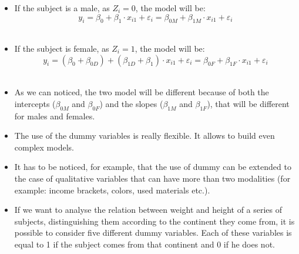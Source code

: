 \begin{frame}
  \vspace*{.25cm}
  \begin{itemize}
    \item If the subject is a male, as  $ Z_i=0 $, the model will be:
      \vspace{-0.25cm} $$ y_i = \beta_0 + \beta_1 \cdot x_{i1} + \varepsilon_i = \beta_{0M} + \beta_{1M} \cdot x_{i1} + \varepsilon_i $$ \\
    \vspace{0.25cm}
    \item If the subject is female, as $ Z_i=1 $, the model will be:
      \vspace{-0.5cm} $$ y_i= (\beta_0 + \beta_{0D}) + (\beta_{1D} + \beta_1) \cdot x_{i1} + \varepsilon_i = \beta_{0F} + \beta_{1F} \cdot x_{i1} + \varepsilon_i $$ \\
    \vspace{0.25cm}
    \item As we can noticed, the two model will be different because of both the intercepts ($ \beta_{0M} $ and $ \beta_{0F} $) and the slopes ($ \beta_{1M} $ and $ \beta_{1F} $), that will be different for males and females.
  \end{itemize}
\end{frame}


\begin{frame}
  \vspace{0.25cm}
  \begin{itemize}
    \item The use of the dummy variables is really flexible. It allows to build even complex models.
    \vspace{0.25cm}
    \item It has to be noticed, for example, that the use of dummy can be extended to the case of qualitative variables that can have more than two modalities (for example: income brackets, colors, used materials etc.).
    \vspace{0.25cm}
    \item If we want to analyse the relation between weight and height of a series of subjects, distinguishing them according to the continent they come from, it is possible to consider five different dummy variables. Each of these variables is equal to 1 if the subject comes from that continent and 0 if he does not. 
  \end{itemize}
\end{frame}

